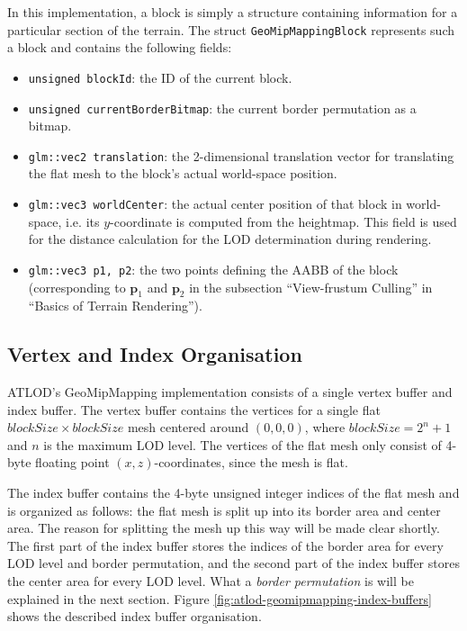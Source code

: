 In this implementation, a block is simply a structure containing information for a
particular section of the terrain. The struct \texttt{GeoMipMappingBlock}
represents such a block and contains the following fields:
\begin{itemize}
  \item \texttt{unsigned blockId}: the ID of the current block.
  \item \texttt{unsigned currentBorderBitmap}: the current border permutation as a bitmap.
  \item \texttt{glm::vec2 translation}: the 2-dimensional translation vector for translating the flat mesh to the block's actual world-space position.
  \item \texttt{glm::vec3 worldCenter}: the actual center position of that block in world-space, i.e. its $y$-coordinate is computed from the heightmap. 
        This field is used for the distance calculation for the LOD determination during rendering.
  \item \texttt{glm::vec3 p1, p2}: the two points defining the AABB of the block (corresponding to $\mathbf{p}_1$ and $\mathbf{p}_2$ in the subsection ``View-frustum Culling'' in ``Basics of Terrain Rendering'').
\end{itemize}

\subsection{Vertex and Index Organisation}
ATLOD's GeoMipMapping implementation consists of a single vertex buffer and index buffer.
The vertex buffer contains the vertices for a single flat $blockSize \times blockSize$ mesh centered around $(0,0,0)$, where $blockSize = 2^n + 1$ and $n$ is the maximum LOD level.
The vertices of the flat mesh only consist of 4-byte floating point $(x,z)$-coordinates, since the mesh is flat.

The index buffer contains the 4-byte unsigned integer indices of the flat mesh and is organized as follows:
the flat mesh is split up into its border area and center area.
The reason for splitting the mesh up this way will be made clear shortly.
The first part of the index buffer stores the indices of the border area
for every LOD level and border permutation, and
the second part of the index buffer stores the center area for every LOD level. 
What a \textit{border permutation} is will be explained in the next section.
Figure \ref{fig:atlod-geomipmapping-index-buffers} shows the described index buffer 
organisation.

